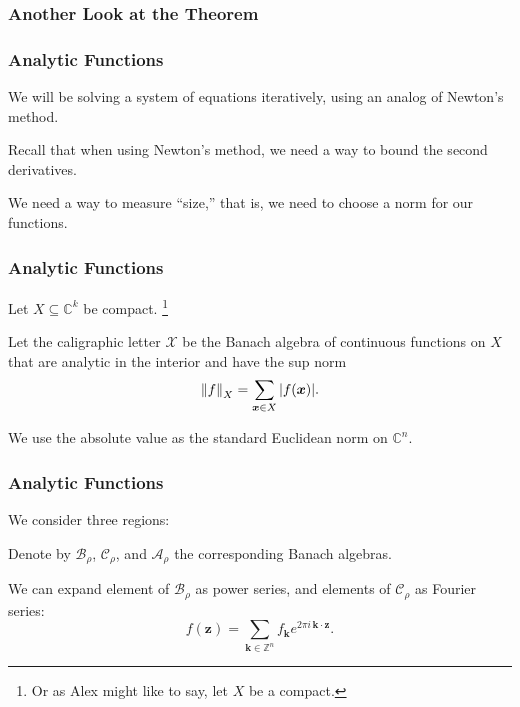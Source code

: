 \documentclass{beamer}
\newcommand{\Z}{\mathbb{Z}}
\newcommand{\C}{\mathbb{C}}
\newcommand{\bp}[1]{\bm{#1}}
\newcommand{\genericdel}[4]{%
  \ifcase#3\relax
  #1#4#2\or
  \bigl#1#4\bigr#2\or
  \Bigl#1#4\Bigr#2\or
  \biggl#1#4\biggr#2\or
  \Biggl#1#4\Biggr#2\else
  \left#1#4\right#2\fi
}
\newcommand{\enVert}[2][-1]{\genericdel\|\|{#1}{#2}}
\let\norm\enVert
\begin{document}
\begin{frame}
  \frametitle{Another Look at the Theorem}
  \begin{kamthm}
    \KAM{}
  \end{kamthm}
\end{frame}

\begin{frame}
  \frametitle{Analytic Functions}

  We will be solving a system of equations iteratively, using an analog of
  Newton's method.
  
  Recall that when using Newton's method, we need a way to bound the second
  derivatives.
  
  We need a way to measure ``size,'' that is, we need to choose a norm for our
  functions.

\end{frame}

\begin{frame}
  \frametitle{Analytic Functions}
  Let $X \subseteq \C^k$ be compact.
  \footnote{ Or as Alex might like to say, let $X$ be a compact.}

  Let the caligraphic letter $\mathcal{X}$ be the Banach algebra of continuous
  functions on $X$ that are analytic in the interior and have the sup norm
  \begin{equation*}
    \norm{f}_X = \sum_{\bp{x} \in X} |f(\bp{x})|.
  \end{equation*}

  We use the absolute value as the standard Euclidean norm on $\C^n$.
\end{frame}

\begin{frame}
  \frametitle{Analytic Functions}
  We consider three regions:
  \domains{}

  Denote by $\mathcal{B}_\rho$, $\mathcal{C}_\rho$, and $\mathcal{A}_\rho$ the
  corresponding Banach algebras.

  We can expand element of $\mathcal{B}_{\rho}$ as power series, and elements of
  $\mathcal{C}_{\rho}$ as Fourier series:
  \begin{equation*}
    f(\bp{z}) = \sum_{\bp{k} \in \Z^n} f_{\bp{k}} e^{2 \pi i \, \bp{k} \cdot \bp{z}}.
  \end{equation*}
\end{frame}
\end{document}
